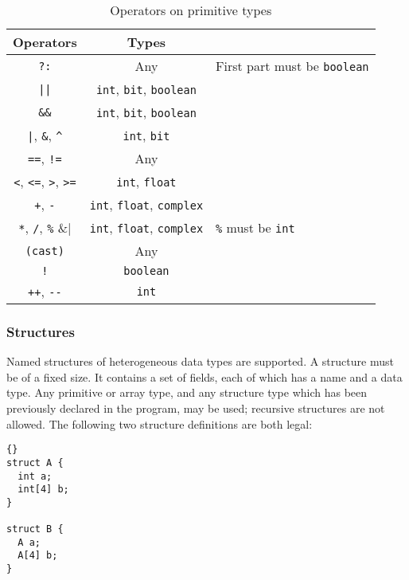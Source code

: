\documentclass[11pt]{article}
\begin{document}
\begin{table}
\begin{center}
\begin{tabular}{ccl}
\toprule
\textbf{Operators} & \textbf{Types} \\
\midrule
\lstinline|?:| & Any & First part must be \lstinline|boolean| \\
\lstinline/||/ & \lstinline|int|, \lstinline|bit|, \lstinline|boolean| \\
\lstinline|&&| & \lstinline|int|, \lstinline|bit|, \lstinline|boolean| \\
\lstinline/|/, \lstinline|&|, \lstinline|^| &
  \lstinline|int|, \lstinline|bit| \\
\lstinline|==|, \lstinline|!=| & Any \\
\lstinline|<|, \lstinline|<=|, \lstinline|>|, \lstinline|>=| &
  \lstinline|int|, \lstinline|float| \\
\lstinline|+|, \lstinline|-| &
  \lstinline|int|, \lstinline|float|, \lstinline|complex| \\
\lstinline|*|, \lstinline|/|, \lstinline|%| &
  \lstinline|int|, \lstinline|float|, \lstinline|complex| &
  \lstinline|%| must be \lstinline|int| \\
\lstinline|(cast)| & Any \\
\lstinline|!| & \lstinline|boolean| \\
\lstinline|++|, \lstinline|--| & \lstinline|int| \\
\bottomrule
\end{tabular}
\end{center}
\vspace{-12pt}
\caption{Operators on primitive types}
\label{tab:primitive-operators}
\end{table}

\subsubsection{Structures}
\label{sec:data-structures}

Named structures of heterogeneous data types are supported.  A
structure must be of a fixed size.  It contains a set of fields, each
of which has a name and a data type.  Any primitive or array type, and
any structure type which has been previously declared in the program,
may be used; recursive structures are not allowed.  The following two
structure definitions are both legal:

\begin{lstlisting}{}
struct A {
  int a;
  int[4] b;
}

struct B {
  A a;
  A[4] b;
}
\end{lstlisting}
\end{document}
